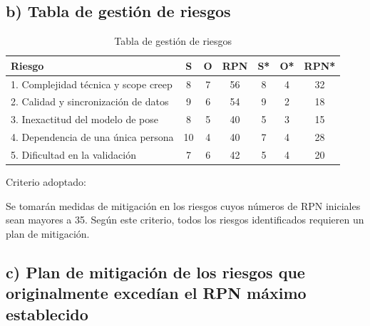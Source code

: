 \documentclass[
11pt, %
]{charter}
\begin{document}
\subsection*{b) Tabla de gestión de riesgos}

\begin{table}[htpb]
\centering
\caption{Tabla de gestión de riesgos}
\label{tab:riesgos}
\begin{tabularx}{\linewidth}{@{}|X|c|c|c|c|c|c|@{}}
\hline
\rowcolor[HTML]{C0C0C0} 
Riesgo & S & O & RPN & S* & O* & RPN* \\ \hline
1. Complejidad técnica y scope creep & 8 & 7 & 56 & 8 & 4 & 32 \\ \hline
2. Calidad y sincronización de datos & 9 & 6 & 54 & 9 & 2 & 18 \\ \hline
3. Inexactitud del modelo de pose & 8 & 5 & 40 & 5 & 3 & 15 \\ \hline
4. Dependencia de una única persona & 10 & 4 & 40 & 7 & 4 & 28 \\ \hline
5. Dificultad en la validación & 7 & 6 & 42 & 5 & 4 & 20 \\ \hline
\end{tabularx}%
\end{table}

Criterio adoptado:

Se tomarán medidas de mitigación en los riesgos cuyos números de RPN iniciales sean mayores a 35. Según este criterio, todos los riesgos identificados requieren un plan de mitigación.

\vspace{0.5cm}

\subsection*{c) Plan de mitigación de los riesgos que originalmente excedían el RPN máximo establecido}
 
\end{document}
